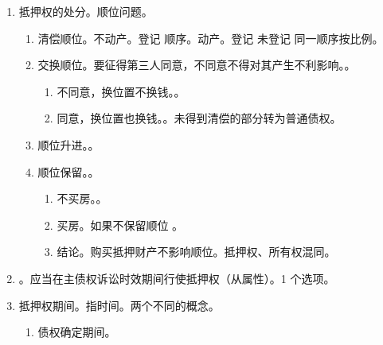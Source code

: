 \begin{enumerate}
\begin{enumerate}
                \begin{enumerate}
                  \item 制度修改。有约从约，无约情况下通知。重大影响 \yjt 同意。
                  \item 丧失物上代位权 \yjt 不属于毁损、灭失、被征收这 3 种情形。
                \end{enumerate}
          \item 抵押权的处分。顺位问题。
                \begin{enumerate}
                  \item 清偿顺位。\yi 不动产。登记 \dy 顺序。\er 动产。登记 \dy 未登记 \dy 同一顺序按比例。
                  \item 交换顺位。要征得第三人同意，不同意不得对其产生不利影响。。
                        \begin{enumerate}
                          \item 不同意，换位置不换钱。。
                          \item 同意，换位置也换钱。。\sjt 未得到清偿的部分转为普通债权。
                        \end{enumerate}
                  \item 顺位升进。。
                  \item 顺位保留。。
                        \begin{enumerate}
                          \item {}不买房。。
                          \item {}买房。如果不保留顺位 \yjt {}。
                          \item 结论。\yi 购买抵押财产不影响顺位。\er 抵押权、所有权混同。
                        \end{enumerate}
                \end{enumerate}
          \item {}。应当在主债权诉讼时效期间行使抵押权（从属性）。1 个选项。
          \item 抵押权期间。指时间。\sjt 两个不同的概念。
                \begin{enumerate}
                  \item \bdy 债权确定期间。

\end{enumerate}
\end{enumerate}
\end{enumerate}
